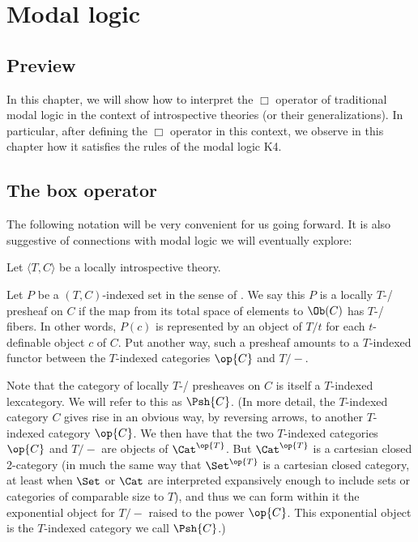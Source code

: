 \filestart

\section{Modal logic}
\subsection{Preview}
In this chapter, we will show how to interpret the $\Box$ operator of traditional modal logic in the context of introspective theories (or their generalizations). In particular, after defining the $\Box$ operator in this context, we observe in this chapter how it satisfies the rules of the modal logic K4.

\subsection{The box operator}
The following notation will be very convenient for us going forward. It is also suggestive of connections with modal logic we will eventually explore:

Let $\langle T, C \rangle$ be a locally introspective theory.

Let $P$ be a $(T, C)$-indexed set in the sense of . We say this $P$ is a locally $T$-\repsmall/ presheaf on $C$ if the map from its total space of elements to $\Ob(C)$ has $T$-\repsmall/ fibers. In other words, $P(c)$ is represented by an object of $T/t$ for each $t$-definable object $c$ of $C$. Put another way, such a presheaf amounts to a $T$-indexed functor between the $T$-indexed categories $\op{C}$ and $T/-$.

Note that the category of locally $T$-\repsmall/ presheaves on $C$ is itself a $T$-indexed lexcategory. We will refer to this as $\Psh{C}$. (In more detail, the $T$-indexed category $C$ gives rise in an obvious way, by reversing arrows, to another $T$-indexed category $\op{C}$. We then have that the two $T$-indexed categories $\op{C}$ and $T/-$ are objects of $\Cat^{\op{T}}$. But $\Cat^{\op{T}}$ is a cartesian closed 2-category (in much the same way that $\Set^{\op{T}}$ is a cartesian closed category, at least when $\Set$ or $\Cat$ are interpreted expansively enough to include sets or categories of comparable size to $T$), and thus we can form within it the exponential object for $T/-$ raised to the power $\op{C}$. This exponential object is the $T$-indexed category we call $\Psh{C}$.)

